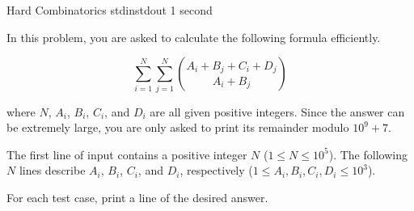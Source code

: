 \begin{problem}{Hard Combinatorics}
{stdin}{stdout}
{1 second}{}{}

In this problem, you are asked to calculate the following formula efficiently.

\begin{equation*}
    \sum_{i = 1}^{N} \sum_{j = 1}^{N} { {A_i + B_j + C_i + D_j} \choose {A_i + B_j} }
\end{equation*}

where $N$, $A_i$, $B_i$, $C_i$, and $D_i$ are all given positive integers. Since the answer can be extremely large, you are only asked to print its remainder modulo $10^9 + 7$.


\InputFile

The first line of input contains a positive integer $N$ ($1 \le N \le 10^5$).
The following $N$ lines describe $A_i$, $B_i$, $C_i$, and $D_i$, respectively ($1 \le A_i, B_i, C_i, D_i \le 10^3$).

\OutputFile

For each test case, print a line of the desired answer. 

\Examples

\begin{example}
%
%
\end{example}

\end{problem}
